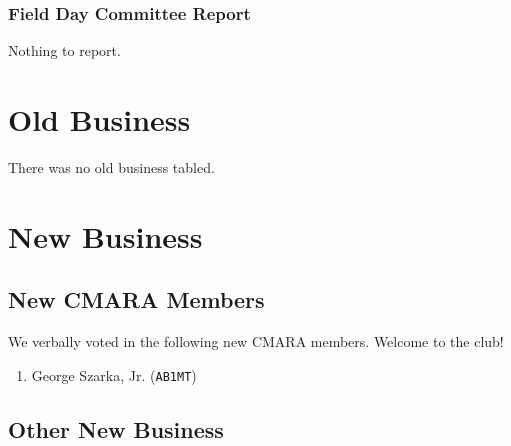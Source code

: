 \documentclass[10pt,letterpaper]{article}
\begin{document}
\subsubsection{Field Day Committee Report}
Nothing to report.

\section{Old Business}
There was no old business tabled.

\section{New Business}

\subsection{New CMARA Members}

We verbally voted in the following new CMARA members. Welcome to the club!
\begin{enumerate}
\item George Szarka, Jr. (\texttt{AB1MT})
\end{enumerate}

\subsection{Other New Business}
\end{document}
